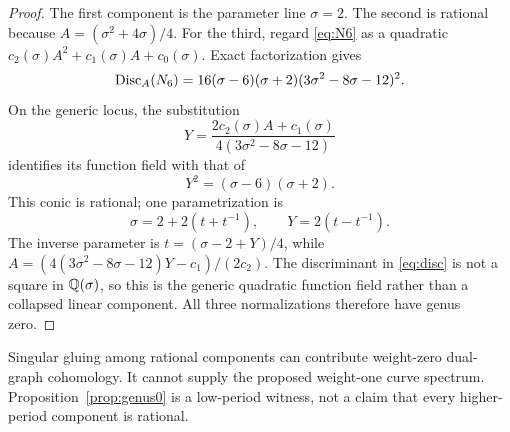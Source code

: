 \begin{proof}
The first component is the parameter line $\sigma=2$.  The second is rational
because $A=(\sigma^2+4\sigma)/4$.  For the third, regard \eqref{eq:N6} as a
quadratic $c_2(\sigma)A^2+c_1(\sigma)A+c_0(\sigma)$.  Exact factorization gives
\begin{equation}\label{eq:disc}
\operatorname{Disc}_A(N_6)=16(\sigma-6)(\sigma+2)
(3\sigma^2-8\sigma-12)^2.
\end{equation}
On the generic locus, the substitution
\begin{equation}
Y=\frac{2c_2(\sigma)A+c_1(\sigma)}
{4(3\sigma^2-8\sigma-12)}
\end{equation}
identifies its function field with that of
\begin{equation}
Y^2=(\sigma-6)(\sigma+2).
\end{equation}
This conic is rational; one parametrization is
\begin{equation}
\sigma=2+2(t+t^{-1}),\qquad Y=2(t-t^{-1}).
\end{equation}
The inverse parameter is $t=(\sigma-2+Y)/4$, while
$A=(4(3\sigma^2-8\sigma-12)Y-c_1)/(2c_2)$.  The discriminant in
\eqref{eq:disc} is not a square in $\mathbb Q(\sigma)$, so this is the generic
quadratic function field rather than a collapsed linear component.  All three
normalizations therefore have genus zero.
\end{proof}

Singular gluing among rational components can contribute weight-zero
dual-graph cohomology.  It cannot supply the proposed weight-one curve
spectrum.  Proposition~\ref{prop:genus0} is a low-period witness, not a claim
that every higher-period component is rational.
